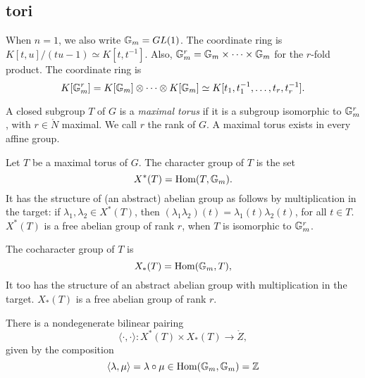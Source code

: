 \subsection{tori}


When $n=1$, we also write ${\Bbb G}_m = GL(1)$.
The coordinate ring is $K[t,u]/(t u - 1)\simeq K[t,t^{-1}]$.
Also, ${\Bbb G}_m^r
={\Bbb G}_m \times \cdots \times {\Bbb G}_m$ for the $r$-fold product.
The coordinate ring is
\[
K[{\Bbb G}_m^r]=K[{\Bbb G}_m]\otimes\cdots\otimes K[{\Bbb G}_m]
\simeq K[t_1,t_1^{-1},\ldots,t_r,t_r^{-1}].
\]


A closed subgroup $T$ of $G$ is a {\it maximal torus} if it is a
subgroup isomorphic to ${\Bbb G}_m^r$, with $r\in\ring{N}$ maximal.  We call
$r$ the rank of $G$.  A maximal torus exists in every affine group.


Let $T$ be a maximal torus of $G$.  The character group of $T$
is the set
\[
X^*(T) = \text{Hom}(T,{\Bbb G}_m).
\]
It has the structure of (an abstract) abelian group as follows
by multiplication in the target:
if $\lambda_1,\lambda_2\in X^*(T)$, then $(\lambda_1\lambda_2)(t) =
\lambda_1(t)\lambda_2(t)$, for all $t\in T$.
$X^*(T)$ is a free abelian group of rank $r$,
when $T$ is isomorphic to ${\Bbb G}_m^r$.

The cocharacter group of $T$ is
\[
X_*(T) = \text{Hom}({\Bbb G}_m,T),
\]
It too has the structure of an abstract abelian group
with multiplication in the target.
$X_*(T)$ is a free abelian group of rank $r$.

There is a nondegenerate bilinear pairing
\[
\langle\cdot,\cdot\rangle:X^*(T)\times X_*(T)\to \ring{Z},
\]
given by the composition
\[
\langle \lambda,\mu\rangle =
\lambda\circ\mu \in \text{Hom}({\Bbb G}_m,{\Bbb G}_m) = {\Bbb Z}
\]


